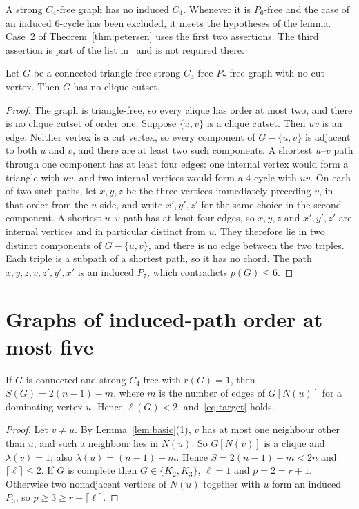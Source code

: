 \documentclass[ASNA]{USG}
\theoremstyle{WBstyletwo}
\numberwithin{equation}{section}
\newcommand{\lr}{\ell}
\newcommand{\pp}{p}
\begin{document}
A strong $C_4$-free graph has no induced $C_4$. Whenever it is $P_6$-free and the case of an induced $6$-cycle has been excluded, it meets the hypotheses of the lemma. Case~2 of Theorem~\ref{thm:petersen} uses the first two assertions. The third assertion is part of the list in~\cite{km} and is not required there.

\begin{lemma}\label{lem:nocut}
Let $G$ be a connected triangle-free strong $C_4$-free $P_7$-free graph with no cut vertex. Then $G$ has no clique cutset.
\end{lemma}

\begin{proof}
The graph is triangle-free, so every clique has order at most two, and there is no clique cutset of order one. Suppose $\{u,v\}$ is a clique cutset. Then $uv$ is an edge. Neither vertex is a cut vertex, so every component of $G-\{u,v\}$ is adjacent to both $u$ and $v$, and there are at least two such components. A shortest $u$--$v$ path through one component has at least four edges: one internal vertex would form a triangle with $uv$, and two internal vertices would form a $4$-cycle with $uv$. On each of two such paths, let $x,y,z$ be the three vertices immediately preceding $v$, in that order from the $u$-side, and write $x',y',z'$ for the same choice in the second component. A shortest $u$--$v$ path has at least four edges, so $x,y,z$ and $x',y',z'$ are internal vertices and in particular distinct from $u$. They therefore lie in two distinct components of $G-\{u,v\}$, and there is no edge between the two triples. Each triple is a subpath of a shortest path, so it has no chord. The path $x,y,z,v,z',y',x'$ is an induced $P_7$, which contradicts $\pp(G)\le 6$.
\end{proof}

\section{Graphs of induced-path order at most five}\label{sec:small}

\begin{lemma}\label{lem:r1}
If $G$ is connected and strong $C_4$-free with $r(G)=1$, then $S(G)=2(n-1)-m$, where $m$ is the number of edges of $G[N(u)]$ for a dominating vertex $u$. Hence $\lr(G)<2$, and~\eqref{eq:target} holds.
\end{lemma}

\begin{proof}
Let $v\ne u$. By Lemma~\ref{lem:basic}(1), $v$ has at most one neighbour other than $u$, and such a neighbour lies in $N(u)$. So $G[N(v)]$ is a clique and $\lambda(v)=1$; also $\lambda(u)=(n-1)-m$. Hence $S=2(n-1)-m<2n$ and $\lceil\lr\rceil\le 2$. If $G$ is complete then $G\in\{K_2,K_3\}$, $\lr=1$ and $\pp=2=r+1$. Otherwise two nonadjacent vertices of $N(u)$ together with $u$ form an induced $P_3$, so $\pp\ge 3\ge r+\lceil\lr\rceil$.
\end{proof}
\end{document}
